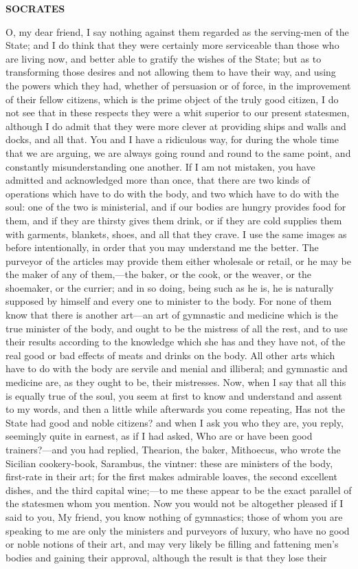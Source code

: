 \documentclass[11pt,letter]{article}
\begin{document}
\par \textbf{SOCRATES}
\par   O, my dear friend, I say nothing against them regarded as the serving-men of the State; and I do think that they were certainly more serviceable than those who are living now, and better able to gratify the wishes of the State; but as to transforming those desires and not allowing them to have their way, and using the powers which they had, whether of persuasion or of force, in the improvement of their fellow citizens, which is the prime object of the truly good citizen, I do not see that in these respects they were a whit superior to our present statesmen, although I do admit that they were more clever at providing ships and walls and docks, and all that. You and I have a ridiculous way, for during the whole time that we are arguing, we are always going round and round to the same point, and constantly misunderstanding one another. If I am not mistaken, you have admitted and acknowledged more than once, that there are two kinds of operations which have to do with the body, and two which have to do with the soul:  one of the two is ministerial, and if our bodies are hungry provides food for them, and if they are thirsty gives them drink, or if they are cold supplies them with garments, blankets, shoes, and all that they crave. I use the same images as before intentionally, in order that you may understand me the better. The purveyor of the articles may provide them either wholesale or retail, or he may be the maker of any of them,—the baker, or the cook, or the weaver, or the shoemaker, or the currier; and in so doing, being such as he is, he is naturally supposed by himself and every one to minister to the body. For none of them know that there is another art—an art of gymnastic and medicine which is the true minister of the body, and ought to be the mistress of all the rest, and to use their results according to the knowledge which she has and they have not, of the real good or bad effects of meats and drinks on the body. All other arts which have to do with the body are servile and menial and illiberal; and gymnastic and medicine are, as they ought to be, their mistresses. Now, when I say that all this is equally true of the soul, you seem at first to know and understand and assent to my words, and then a little while afterwards you come repeating, Has not the State had good and noble citizens? and when I ask you who they are, you reply, seemingly quite in earnest, as if I had asked, Who are or have been good trainers?—and you had replied, Thearion, the baker, Mithoecus, who wrote the Sicilian cookery-book, Sarambus, the vintner:  these are ministers of the body, first-rate in their art; for the first makes admirable loaves, the second excellent dishes, and the third capital wine;—to me these appear to be the exact parallel of the statesmen whom you mention. Now you would not be altogether pleased if I said to you, My friend, you know nothing of gymnastics; those of whom you are speaking to me are only the ministers and purveyors of luxury, who have no good or noble notions of their art, and may very likely be filling and fattening men’s bodies and gaining their approval, although the result is that they lose their 
\end{document}
